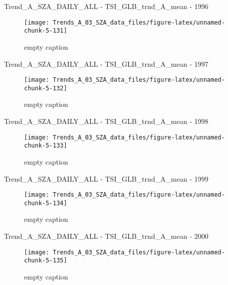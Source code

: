 \documentclass[
  10pt,
  a4paper,oneside]{article}
\begin{document}
Trend\_A\_SZA\_DAILY\_ALL - TSI\_GLB\_trnd\_A\_mean - 1996

\begin{figure}[!ht]

{\centering \texttt{[image: Trends\_A\_03\_SZA\_data\_files/figure-latex/unnamed-chunk-5-131]} 

}

\caption{ empty caption }\label{fig:unnamed-chunk-5-131}
\end{figure}

Trend\_A\_SZA\_DAILY\_ALL - TSI\_GLB\_trnd\_A\_mean - 1997

\begin{figure}[!ht]

{\centering \texttt{[image: Trends\_A\_03\_SZA\_data\_files/figure-latex/unnamed-chunk-5-132]} 

}

\caption{ empty caption }\label{fig:unnamed-chunk-5-132}
\end{figure}

Trend\_A\_SZA\_DAILY\_ALL - TSI\_GLB\_trnd\_A\_mean - 1998

\begin{figure}[!ht]

{\centering \texttt{[image: Trends\_A\_03\_SZA\_data\_files/figure-latex/unnamed-chunk-5-133]} 

}

\caption{ empty caption }\label{fig:unnamed-chunk-5-133}
\end{figure}

Trend\_A\_SZA\_DAILY\_ALL - TSI\_GLB\_trnd\_A\_mean - 1999

\begin{figure}[!ht]

{\centering \texttt{[image: Trends\_A\_03\_SZA\_data\_files/figure-latex/unnamed-chunk-5-134]} 

}

\caption{ empty caption }\label{fig:unnamed-chunk-5-134}
\end{figure}

Trend\_A\_SZA\_DAILY\_ALL - TSI\_GLB\_trnd\_A\_mean - 2000

\begin{figure}[!ht]

{\centering \texttt{[image: Trends\_A\_03\_SZA\_data\_files/figure-latex/unnamed-chunk-5-135]} 

}

\caption{ empty caption }\label{fig:unnamed-chunk-5-135}
\end{figure}
\end{document}
